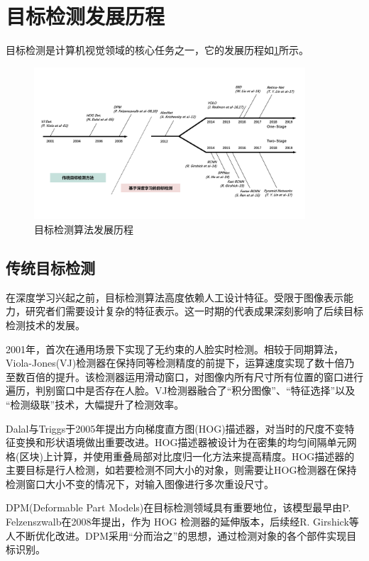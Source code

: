 \section{目标检测发展历程}

目标检测是计算机视觉领域的核心任务之一，它的发展历程如\ref{fig:his}所示。

\begin{figure}[!htb]
  \centering
  \includegraphics[width=0.9\textwidth]{figs/chap01/his.png}
  \caption{目标检测算法发展历程}
  \label{fig:his}
\end{figure}

\subsection{传统目标检测}
在深度学习兴起之前，目标检测算法高度依赖人工设计特征。受限于图像表示能力，研究者们需要设计复杂的特征表示。这一时期的代表成果深刻影响了后续目标检测技术的发展。

2001年，\textcite{Viola2001}首次在通用场景下实现了无约束的人脸实时检测。相较于同期算法，Viola-Jones(VJ)检测器在保持同等检测精度的前提下，运算速度实现了数十倍乃至数百倍的提升。该检测器运用滑动窗口，对图像内所有尺寸所有位置的窗口进行遍历，判别窗口中是否存在人脸。VJ检测器融合了“积分图像”、“特征选择”以及 “检测级联”技术，大幅提升了检测效率。

Dalal与Triggs于2005年提出方向梯度直方图(HOG)描述器，对当时的尺度不变特征变换和形状语境做出重要改进\cite{Dalal2005}。HOG描述器被设计为在密集的均匀间隔单元网格(区块)上计算，并使用重叠局部对比度归一化方法来提高精度。HOG描述器的主要目标是行人检测，如若要检测不同大小的对象，则需要让HOG检测器在保持检测窗口大小不变的情况下，对输入图像进行多次重设尺寸。

DPM(Deformable Part Models)在目标检测领域具有重要地位，该模型最早由P. Felzenszwalb在2008年提出\cite{Felzenszwalb2008}，作为 HOG 检测器的延伸版本，后续经R. Girshick等人不断优化改进\cite{Felzenszwalb2010Cascade}。DPM采用“分而治之”的思想，通过检测对象的各个部件实现目标识别。

